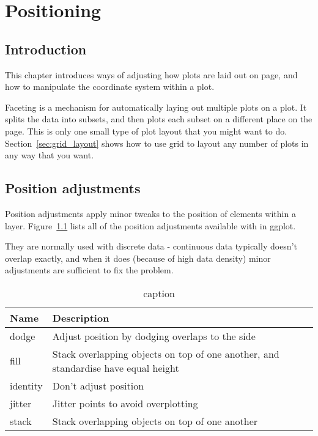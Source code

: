 
\chapter{Positioning}
\label{cha:position}

\section{Introduction}

This chapter introduces ways of adjusting how plots are laid out on page, and how to manipulate the coordinate system within a plot.

Faceting is a mechanism for automatically laying out multiple plots on a plot.  It splits the data into subsets, and then plots each subset on a different place on the page.  This is only one small type of plot layout that you might want to do.  Section~\ref{sec:grid_layout} shows how to use grid to layout any number of plots in any way that you want.


\section{Position adjustments}
\label{sec:position}

Position adjustments apply minor tweaks to the position of elements within a layer.  Figure~\ref{fig:position} lists all of the position adjustments available with in ggplot.  

They are normally used with discrete data - continuous data typically doesn't overlap exactly, and when it does (because of high data density) minor adjustments are sufficient to fix the problem.

\begin{table}
  \begin{center}
  \begin{tabular}{ll}
    \toprule
    Name      & Description  \\
    \midrule
    dodge    & Adjust position by dodging overlaps to the side \\
    fill     & Stack overlapping objects on top of one another, and standardise have equal height\\
    identity & Don't adjust position \\
    jitter   & Jitter points to avoid overplotting \\
    stack    & Stack overlapping objects on top of one another \\
    \bottomrule
  \end{tabular}
  \end{center}
  \caption{caption}
  \label{fig:position}
\end{table}

